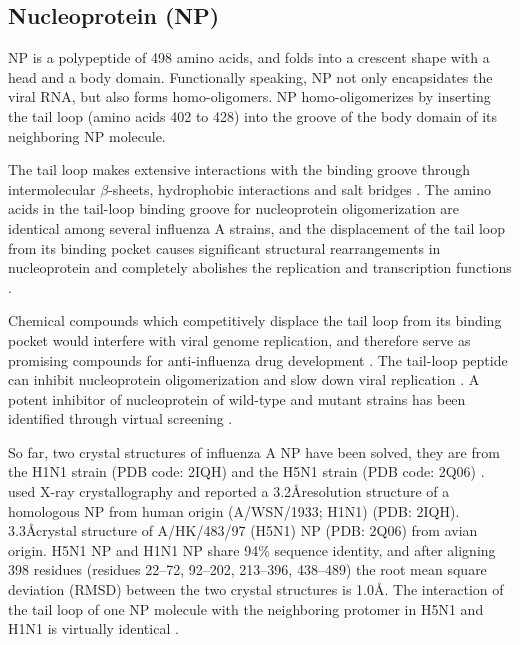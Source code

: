 
\subsection{Nucleoprotein (NP)}

NP is a polypeptide of 498 amino acids, and folds into a crescent shape with a head and a body domain. Functionally speaking, NP not only encapsidates the viral RNA, but also forms homo-oligomers. NP homo-oligomerizes by inserting the tail loop (amino acids 402 to 428) into the groove of the body domain of its neighboring NP molecule.

The tail loop makes extensive interactions with the binding groove through intermolecular $\beta$-sheets, hydrophobic interactions and salt bridges \citep{1140}. The amino acids in the tail-loop binding groove for nucleoprotein oligomerization are identical among several influenza A strains, and the displacement of the tail loop from its binding pocket causes significant structural rearrangements in nucleoprotein and completely abolishes the replication and transcription functions \citep{1231}.

Chemical compounds which competitively displace the tail loop from its binding pocket would interfere with viral genome replication, and therefore serve as promising compounds for anti-influenza drug development \citep{1140,1231,1232}. The tail-loop peptide can inhibit nucleoprotein oligomerization and slow down viral replication \citep{1233}. A potent inhibitor of nucleoprotein of wild-type and mutant strains has been identified through virtual screening \citep{1233}.

So far, two crystal structures of influenza A NP have been solved, they are from the H1N1 strain (PDB code: 2IQH) \citep{1140} and the H5N1 strain (PDB code: 2Q06) \citep{1231}. \citep{1140} used X-ray crystallography and reported a 3.2\AA resolution structure of a homologous NP from human origin (A/WSN/1933; H1N1) (PDB: 2IQH). \citep{1231} 3.3\AA crystal structure of A/HK/483/97 (H5N1) NP (PDB: 2Q06) from avian origin. H5N1 NP and H1N1 NP share 94\% sequence identity, and after aligning 398 residues (residues 22–72, 92–202, 213–396, 438–489) the root mean square deviation (RMSD) between the two crystal structures is 1.0\AA \citep{1140}. The interaction of the tail loop of one NP molecule with the neighboring protomer in H5N1 and H1N1 is virtually identical \citep{1140}.

